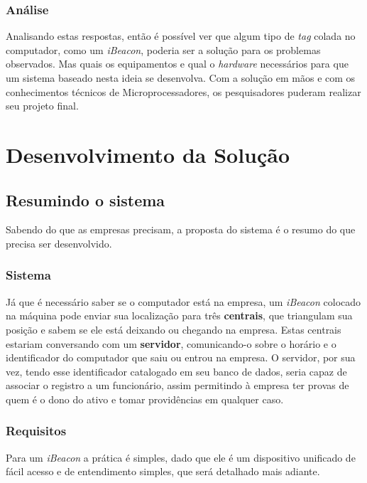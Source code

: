\documentclass[
	12pt,				%
	openright,			%
	twoside,			%
	a4paper,			%
	english,			%
	french,				%
	spanish,			%
	brazil				%
	]{abntex2}
\begin{document}
\section{Análise}

Analisando estas respostas, então é possível ver que algum tipo de \emph{tag} colada no computador, como um \emph{iBeacon}, poderia ser a solução para os problemas observados. Mas quais os equipamentos e qual o \emph{hardware} necessários para que um sistema baseado nesta ideia se desenvolva. Com a solução em mãos e com os conhecimentos técnicos de Microprocessadores, os pesquisadores puderam realizar seu projeto final.

\part{Desenvolvimento da Solução}

\chapter{Resumindo o sistema}

Sabendo do que as empresas precisam, a proposta do sistema é o resumo do que precisa ser desenvolvido.

\section{Sistema}

Já que é necessário saber se o computador está na empresa, um \emph{iBeacon} colocado na máquina pode enviar sua localização para três \textbf{centrais}, que triangulam sua posição e sabem se ele está deixando ou chegando na empresa. Estas centrais estariam conversando com um \textbf{servidor}, comunicando-o sobre o horário e o identificador do computador que saiu ou entrou na empresa. O servidor, por sua vez, tendo esse identificador catalogado em seu banco de dados, seria capaz de associar o registro a um funcionário, assim permitindo à empresa ter provas de quem é o dono do ativo e tomar providências em qualquer caso.

\section{Requisitos}

Para um \emph{iBeacon} a prática é simples, dado que ele é um dispositivo unificado de fácil acesso e de entendimento simples, que será detalhado mais adiante. 
\end{document}
